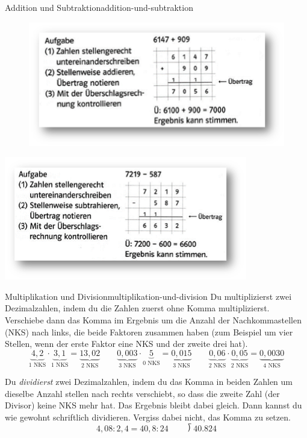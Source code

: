 \documentclass[12pt,a5paper,landscape]{scrartcl}
\begin{document}
	\begin{hilfekarte}{Addition und Subtraktion}{addition-und-subtraktion}
		\begin{figure}		
			\includegraphics[height=.45\textheight]{6.2-LT-Abb_Addition}
		\end{figure}
		
		
		\includegraphics[height=.45\textheight]{6.2-LT-Abb_Subtraktion}
	\end{hilfekarte}
	
	\begin{hilfekarte}{Multiplikation und Division}{multiplikation-und-division}
		Du multiplizierst zwei Dezimalzahlen, indem du die Zahlen zuerst ohne Komma multiplizierst. Verschiebe dann das Komma im Ergebnis um die Anzahl der Nachkommastellen (NKS) nach links, die beide Faktoren zusammen haben (zum Beispiel um vier Stellen, wenn der erste Faktor eine NKS und der zweite drei hat).
		\[
		\underbrace{4,2}_{\text{1 NKS}}\cdot \underbrace{3,1}_{\text{1 NKS}} = \underbrace{13,02}_{\text{2 NKS}} \qquad 
		\underbrace{0,003}_{\text{3 NKS}}\cdot \underbrace{5}_{\text{0 NKS}} = \underbrace{0,015}_{\text{3 NKS}} \qquad
		\underbrace{0,06}_{\text{2 NKS}}\cdot \underbrace{0,05}_{\text{2 NKS}} = \underbrace{0,0030}_{\text{4 NKS}}
		\]
		
		Du \emph{dividierst} zwei Dezimalzahlen, indem du das Komma in beiden Zahlen um dieselbe Anzahl stellen nach rechts verschiebt, so dass die zweite Zahl (der Divisor) keine NKS mehr hat. Das Ergebnis bleibt dabei gleich. 
		Dann kannst du wie gewohnt schriftlich dividieren. Vergiss dabei nicht, das Komma zu setzen.
		\[ 4,08 : 2,4 = 40,8 : 24 \qquad \longdivision{40.8}{24} \]
	\end{hilfekarte}
	
\end{document}
